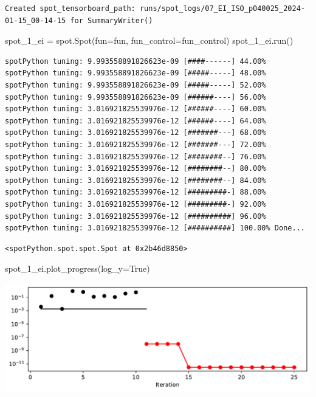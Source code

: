 \documentclass[
  letterpaper,
  DIV=11,
  numbers=noendperiod]{scrreprt}
\newenvironment{Shaded}{\begin{snugshade}}{\end{snugshade}}
\newcommand{\NormalTok}[1]{\textcolor[rgb]{0.00,0.23,0.31}{#1}}
\newcommand{\OperatorTok}[1]{\textcolor[rgb]{0.37,0.37,0.37}{#1}}
\newcommand{\VariableTok}[1]{\textcolor[rgb]{0.07,0.07,0.07}{#1}}
\begin{document}
\begin{verbatim}
Created spot_tensorboard_path: runs/spot_logs/07_EI_ISO_p040025_2024-01-15_00-14-15 for SummaryWriter()
\end{verbatim}

\begin{Shaded}
\begin{Highlighting}[]
\NormalTok{spot\_1\_ei }\OperatorTok{=}\NormalTok{ spot.Spot(fun}\OperatorTok{=}\NormalTok{fun,}
\NormalTok{                     fun\_control}\OperatorTok{=}\NormalTok{fun\_control)}
\NormalTok{spot\_1\_ei.run()}
\end{Highlighting}
\end{Shaded}

\begin{verbatim}
spotPython tuning: 9.993558891826623e-09 [####------] 44.00% 
spotPython tuning: 9.993558891826623e-09 [#####-----] 48.00% 
spotPython tuning: 9.993558891826623e-09 [#####-----] 52.00% 
spotPython tuning: 9.993558891826623e-09 [######----] 56.00% 
spotPython tuning: 3.016921825539976e-12 [######----] 60.00% 
spotPython tuning: 3.016921825539976e-12 [######----] 64.00% 
spotPython tuning: 3.016921825539976e-12 [#######---] 68.00% 
spotPython tuning: 3.016921825539976e-12 [#######---] 72.00% 
spotPython tuning: 3.016921825539976e-12 [########--] 76.00% 
spotPython tuning: 3.016921825539976e-12 [########--] 80.00% 
spotPython tuning: 3.016921825539976e-12 [########--] 84.00% 
spotPython tuning: 3.016921825539976e-12 [#########-] 88.00% 
spotPython tuning: 3.016921825539976e-12 [#########-] 92.00% 
spotPython tuning: 3.016921825539976e-12 [##########] 96.00% 
spotPython tuning: 3.016921825539976e-12 [##########] 100.00% Done...
\end{verbatim}

\begin{verbatim}
<spotPython.spot.spot.Spot at 0x2b46d8850>
\end{verbatim}

\begin{Shaded}
\begin{Highlighting}[]
\NormalTok{spot\_1\_ei.plot\_progress(log\_y}\OperatorTok{=}\VariableTok{True}\NormalTok{)}
\end{Highlighting}
\end{Shaded}

\includegraphics{012_num_spot_ei_files/figure-pdf/cell-10-output-1.pdf}
\end{document}
